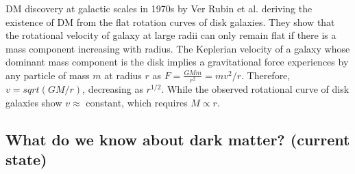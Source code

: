 \documentclass[paper=a4, fontsize=11pt]{scrartcl} %
\numberwithin{equation}{section} %
\numberwithin{figure}{section} %
\numberwithin{table}{section} %
\begin{document}
DM discovery at galactic scales in 1970s by Ver Rubin et al. deriving the existence of DM from the flat rotation curves of disk galaxies. They show that the rotational velocity of galaxy at large radii can only remain flat if there is a mass component increasing with radius. The Keplerian velocity of a galaxy whose dominant mass component is the disk implies a gravitational force experiences by any particle of mass $m$ at radius $r$ as $F = \frac{G M m}{r^2} = m v^2/r$. Therefore, $v = sqrt(GM/r)$, decreasing as $r^{1/2}$. While the observed rotational curve of disk galaxies show $v \approx$ constant, which requires $M \propto r$.

\subsection{What do we know about dark matter? (current state)}
\end{document}
